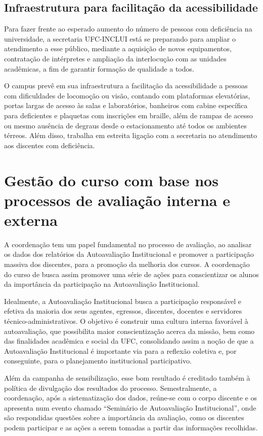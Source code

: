 \subsection{Infraestrutura para facilitação da acessibilidade }
Para fazer frente ao esperado aumento do número de pessoas com deficiência na universidade, a secretaria UFC-INCLUI está se preparando para ampliar o atendimento a esse público, mediante a aquisição de novos equipamentos, contratação de intérpretes e ampliação da interlocução com as unidades acadêmicas, a fim de garantir formação de qualidade a todos.

O campus prevê em sua infraestrutura a facilitação da acessibilidade a pessoas com dificuldades de locomoção ou visão, contando com plataformas elevatórias, portas largas de acesso às salas e laboratórios, banheiros com cabine específica para deficientes e plaquetas com inscrições em braille, além de rampas de acesso ou mesmo ausência de degraus desde o estacionamento até todos os ambientes térreos. Além disso, trabalha em estreita ligação com a secretaria no atendimento aos discentes com deficiência.

\section{Gestão do curso com base nos processos de avaliação interna e externa}

A coordenação tem um papel fundamental no processo de avaliação, ao analisar os dados dos relatórios da Autoavaliação Institucional e promover a participação massiva dos discentes, para a promoção da melhoria dos cursos. A coordenação do curso de \nomedocurso busca assim promover uma série de ações para conscientizar os alunos da importância da participação na Autoavaliação Institucional. %

Idealmente, a Autoavaliação Institucional busca a participação responsável e efetiva da maioria dos seus agentes, egressos, discentes, docentes e servidores técnico-administrativos. O objetivo é construir uma cultura interna favorável à autoavaliação, que possibilita maior conscientização acerca da missão, bem como das finalidades acadêmica e social da UFC, consolidando assim a noção de que a Autoavaliação Institucional é importante via para a reflexão coletiva e, por conseguinte, para o planejamento institucional participativo.

Além da campanha de sensibilização, esse bom resultado é creditado também à política de divulgação dos resultados do processo. Semestralmente, a coordenação, após a sistematização dos dados, reúne-se com o corpo discente e os apresenta num evento chamado “Seminário de Autoavaliação Institucional”, onde são respondidas questões sobre a importância da avaliação, como os discentes podem participar e as ações a serem tomadas a partir das informações recolhidas.


